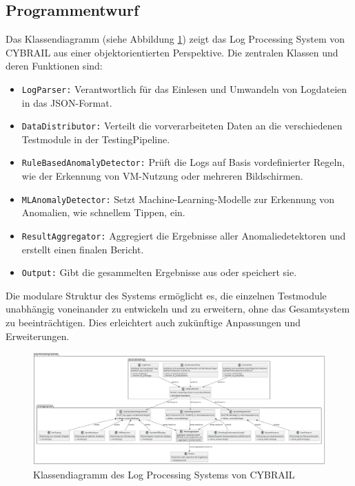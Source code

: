 \subsection{Programmentwurf}

Das Klassendiagramm (siehe Abbildung \ref{fig:Klassen}) zeigt das Log Processing System von CYBRAIL aus einer objektorientierten Perspektive. Die zentralen Klassen und deren Funktionen sind: \begin{itemize} \item \texttt{LogParser:} Verantwortlich für das Einlesen und Umwandeln von Logdateien in das JSON-Format. \item \texttt{DataDistributor:} Verteilt die vorverarbeiteten Daten an die verschiedenen Testmodule in der TestingPipeline. \item \texttt{RuleBasedAnomalyDetector:} Prüft die Logs auf Basis vordefinierter Regeln, wie der Erkennung von VM-Nutzung oder mehreren Bildschirmen. \item \texttt{MLAnomalyDetector:} Setzt Machine-Learning-Modelle zur Erkennung von Anomalien, wie schnellem Tippen, ein. \item \texttt{ResultAggregator:} Aggregiert die Ergebnisse aller Anomaliedetektoren und erstellt einen finalen Bericht. \item \texttt{Output:} Gibt die gesammelten Ergebnisse aus oder speichert sie. \end{itemize}

Die modulare Struktur des Systems ermöglicht es, die einzelnen Testmodule unabhängig voneinander zu entwickeln und zu erweitern, ohne das Gesamtsystem zu beeinträchtigen. Dies erleichtert auch zukünftige Anpassungen und Erweiterungen.

\begin{landscape} \begin{figure}[h] \centering \includegraphics[width=1.5\textwidth]{figures/CybrailClassdiagramm.pdf} \caption{Klassendiagramm des Log Processing Systems von CYBRAIL} \label{fig:Klassen} \end{figure} \end{landscape}


